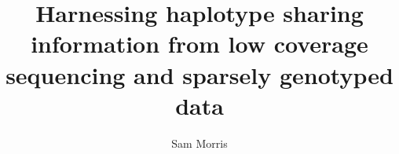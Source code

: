 
\title{Harnessing haplotype sharing information from low coverage sequencing and sparsely genotyped data }
\author{Sam Morris}

\maketitle
\makedeclaration

\begin{abstract} %
\end{abstract}

\begin{acknowledgements}


\end{acknowledgements}

\setcounter{tocdepth}{2} 

\tableofcontents
\listoffigures
\listoftables

